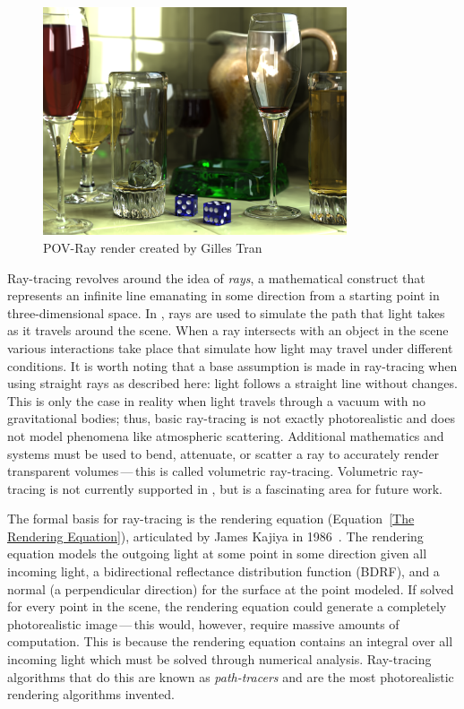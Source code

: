 \begin{figure}[htb]
  \centering
  \includegraphics[width=0.8\textwidth]{resources/glasses_povray}
  \caption{POV-Ray render created by Gilles Tran~\cite{povray2006render}}
\label{fig:povray_render}
\end{figure}

Ray-tracing revolves around the idea of {\it rays}, a mathematical construct that represents an infinite line emanating in some direction from a starting point in three-dimensional space.
In \name{}, rays are used to simulate the path that light takes as it travels around the scene.
When a ray intersects with an object in the scene various interactions take place that simulate how light may travel under different conditions.
It is worth noting that a base assumption is made in ray-tracing when using straight rays as described here: light follows a straight line without changes.
This is only the case in reality when light travels through a vacuum with no gravitational bodies; thus, basic ray-tracing is not exactly photorealistic and does not model phenomena like atmospheric scattering.
Additional mathematics and systems must be used to bend, attenuate, or scatter a ray to accurately render transparent volumes\,---\,this is called volumetric ray-tracing.
Volumetric ray-tracing is not currently supported in \name{}, but is a fascinating area for future work.

The formal basis for ray-tracing is the rendering equation (Equation~\ref{The Rendering Equation}), articulated by James Kajiya in 1986~\cite{kajiya1986rendering}.
The rendering equation models the outgoing light at some point in some direction given all incoming light, a bidirectional reflectance distribution function (BDRF), and a normal (a perpendicular direction) for the surface at the point modeled.
If solved for every point in the scene, the rendering equation could generate a completely photorealistic image\,---\,this would, however, require massive amounts of computation.
This is because the rendering equation contains an integral over all incoming light which must be solved through numerical analysis.
Ray-tracing algorithms that do this are known as {\it path-tracers\/} and are the most photorealistic rendering algorithms invented.

